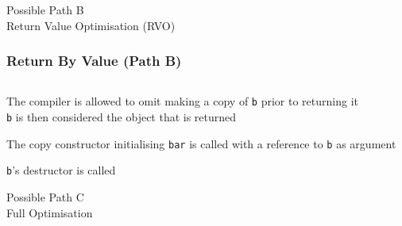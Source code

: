 \begin{frame}
  \begin{center} \Huge
    Possible Path B \\[4mm]
    Return Value Optimisation (RVO)
  \end{center}
\end{frame}

\begin{frame}
  \frametitle{Return By Value (Path B)}
  \begin{center}
    \begin{columns}
      \column{4cm}
      \column{4cm}
    \end{columns}
  \end{center}
  \vskip2mm
  \begin{overprint}
    \begin{center}
      The compiler is allowed to omit making a copy of {\tt b} prior to returning it \\
      {\tt b} is then considered the object that is returned
    \end{center}

    \begin{center}
      The copy constructor initialising {\tt bar} is called with a reference to {\tt b} as argument
    \end{center}

    \begin{center}
      {\tt b}'s destructor is called
    \end{center}
  \end{overprint}
\end{frame}

\begin{frame}
  \begin{center} \Huge
    Possible Path C \\[4mm]
    Full Optimisation
  \end{center}
\end{frame}

